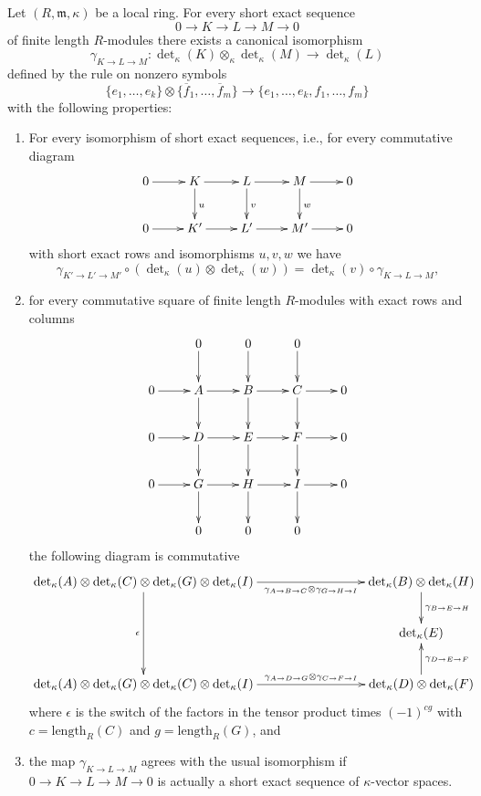 \begin{lemma}
\label{lemma-det-exact-sequences}
Let $(R, \mathfrak m, \kappa)$ be a local ring.
For every short exact sequence
$$
0 \to K \to L \to M \to 0
$$
of finite length $R$-modules there exists a canonical isomorphism
$$
\gamma_{K \to L \to M} :
\det\nolimits_\kappa(K) \otimes_\kappa \det\nolimits_\kappa(M)
\longrightarrow
\det\nolimits_\kappa(L)
$$
defined by the rule on nonzero symbols
$$
\{e_1, \ldots, e_k\}
\otimes
\{\overline{f}_1, \ldots, \overline{f}_m\}
\longrightarrow
\{e_1, \ldots, e_k, f_1, \ldots, f_m\}
$$
with the following properties:
\begin{enumerate}
\item For every isomorphism of short exact sequences, i.e., for
every commutative diagram
$$
\xymatrix{
0 \ar[r] &
K \ar[r] \ar[d]^u &
L \ar[r] \ar[d]^v &
M \ar[r] \ar[d]^w &
0 \\
0 \ar[r] &
K' \ar[r] &
L' \ar[r] &
M' \ar[r] &
0
}
$$
with short exact rows and isomorphisms $u, v, w$ we have
$$
\gamma_{K' \to L' \to M'} \circ
(\det\nolimits_\kappa(u) \otimes \det\nolimits_\kappa(w))
=
\det\nolimits_\kappa(v) \circ
\gamma_{K \to L \to M},
$$
\item for every commutative square of finite length $R$-modules
with exact rows and columns
$$
\xymatrix{
& 0 \ar[d] & 0 \ar[d] & 0 \ar[d] & \\
0 \ar[r] & A \ar[r] \ar[d] & B \ar[r] \ar[d] & C \ar[r] \ar[d] & 0 \\
0 \ar[r] & D \ar[r] \ar[d] & E \ar[r] \ar[d] & F \ar[r] \ar[d] & 0 \\
0 \ar[r] & G \ar[r] \ar[d] & H \ar[r] \ar[d] & I \ar[r] \ar[d] & 0 \\
& 0  & 0  & 0  &
}
$$
the following diagram is commutative
$$
\xymatrix{
\det\nolimits_\kappa(A) \otimes
\det\nolimits_\kappa(C) \otimes
\det\nolimits_\kappa(G) \otimes 
\det\nolimits_\kappa(I)
\ar[dd]_{\epsilon}
\ar[rrr]_-{\gamma_{A \to B \to C} \otimes \gamma_{G \to H \to I}}
& & &
\det\nolimits_\kappa(B) \otimes 
\det\nolimits_\kappa(H)
\ar[d]^{\gamma_{B \to E \to H}}
\\
& & & \det\nolimits_\kappa(E)
\\
\det\nolimits_\kappa(A) \otimes
\det\nolimits_\kappa(G) \otimes
\det\nolimits_\kappa(C) \otimes 
\det\nolimits_\kappa(I)
\ar[rrr]^-{\gamma_{A \to D \to G} \otimes \gamma_{C \to F \to I}}
& & &
\det\nolimits_\kappa(D) \otimes 
\det\nolimits_\kappa(F)
\ar[u]_{\gamma_{D \to E \to F}}
}
$$
where $\epsilon$ is the switch of the factors in the tensor product
times $(-1)^{cg}$ with $c = \text{length}_R(C)$ and $g = \text{length}_R(G)$,
and
\item the map $\gamma_{K \to L \to M}$ agrees with the usual isomorphism
if $0 \to K \to L \to M \to 0$ is actually a short exact sequence
of $\kappa$-vector spaces.
\end{enumerate}
\end{lemma}

